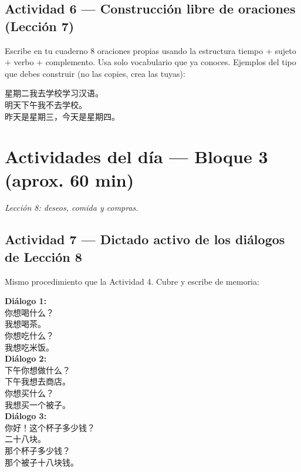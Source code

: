 \documentclass[12pt, a4paper]{article}
\begin{document}
\subsection{Actividad 6 — Construcción libre de oraciones (Lección 7)}

Escribe en tu cuaderno 8 oraciones propias usando la estructura tiempo + sujeto + verbo + complemento. Usa solo vocabulario que ya conoces. Ejemplos del tipo que debes construir (no las copies, crea las tuyas):

\begin{cuadrogris}
星期二我去学校学习汉语。\\
明天下午我不去学校。\\
昨天是星期三，今天是星期四。
\end{cuadrogris}

\section{Actividades del día — Bloque 3 (aprox. 60 min)}
\textit{Lección 8: deseos, comida y compras.}

\subsection{Actividad 7 — Dictado activo de los diálogos de Lección 8}

Mismo procedimiento que la Actividad 4. Cubre y escribe de memoria:

\begin{cuadrogris}
\textbf{Diálogo 1:}\\
你想喝什么？\\
我想喝茶。\\
你想吃什么？\\
我想吃米饭。\\[6pt]
\textbf{Diálogo 2:}\\
下午你想做什么？\\
下午我想去商店。\\
你想买什么？\\
我想买一个被子。\\[6pt]
\textbf{Diálogo 3:}\\
你好！这个杯子多少钱？\\
二十八块。\\
那个杯子多少钱？\\
那个被子十八块钱。
\end{cuadrogris}
\end{document}
